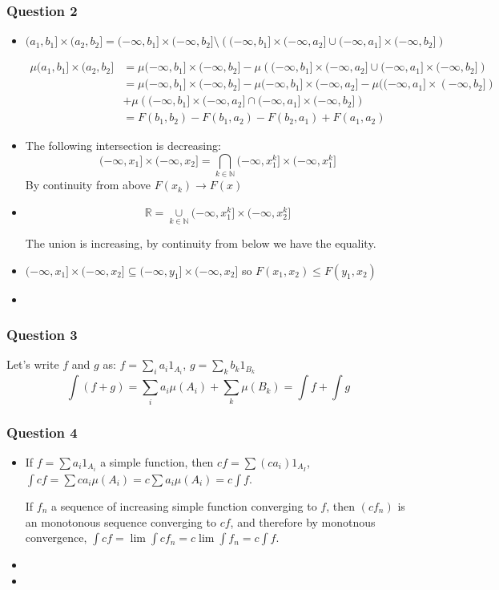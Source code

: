 \documentclass[12pt]{article}
\newcommand{\Q}[1]{\subsubsection*{Question #1}}
\newcommand{\union}[1]{\underset{#1}{\cup} }
\newcommand{\inter}[1]{\underset{#1}{\cap} }
\newcommand{\biginter}[1]{\underset{#1}{\bigcap} }
\begin{document}
\Q{2}
\begin{itemize}

\item
$$(a_1, b_1] \times (a_2, b_2] = (-\infty, b_1] \times (-\infty, b_2]
 \setminus 
\left( (-\infty, b_1] \times (-\infty, a_2] 
 \union{} (-\infty, a_1] \times (-\infty, b_2] \right)$$ 


\begin{align*}
\mu (a_1, b_1] \times (a_2, b_2] 
&= \mu (-\infty, b_1] \times (-\infty, b_2]
 -
\mu \left( (-\infty, b_1] \times (-\infty, a_2] 
 \union{} (-\infty, a_1] \times (-\infty, b_2] \right)\\
&= \mu (-\infty, b_1] \times (-\infty, b_2] 
-\mu  (-\infty, b_1] \times (-\infty, a_2] 
- \mu ((-\infty, a_1] \times (-\infty, b_2]) \\
&+ \mu \left( (-\infty, b_1] \times (-\infty, a_2] 
 \inter{} (-\infty, a_1] \times (-\infty, b_2] \right) \\
&= F(b_1, b_2) - F(b_1, a_2) - F(b_2, a_1) + F(a_1, a_2)
\end{align*}


\item
The following intersection is decreasing:
$$(-\infty, x_1] \times (-\infty, x_2] = \biginter{k \in \mathbb{N}} (-\infty, x^k_1] \times (-\infty, x^k_1]$$
By continuity from above $F(x_k) \rightarrow F(x)$


\item

$$\mathbb{R} = \union{k \in \mathbb{N}} (-\infty, x_1^k] \times (-\infty, x_2^k]$$

The union is increasing, by continuity from below we have the equality.


\item $(-\infty, x_1] \times (-\infty, x_2] \subseteq (-\infty, y_1] \times (-\infty, x_2] $ so $F(x_1, x_2) \leq F(y_1, x_2)$



\item 
\end{itemize}

\Q{3}
Let's write $f$ and $g$ as:
$f = \sum_i a_i 1_{A_i}$, $g = \sum_k b_k 1_{B_k}$
$$\int (f+g) = \sum_i a_i \mu(A_i) + \sum_k \mu(B_k) = \int f + \int g$$

\Q{4}
\begin{itemize}
\item
If $f = \sum a_i 1_{A_i}$ a simple function, then $cf = \sum (c a_i) 1_{A_I}$, $\int c f = \sum c a_i \mu(A_i) = c \sum a_i \mu(A_i) = c \int f$.


If $f_n$ a sequence of increasing simple function converging to $f$, then $(c f_n)$ is an monotonous sequence converging to $c f$, and therefore by monotnous convergence, $\int c f = \lim \int c f_n = c \lim \int f_n = c \int f$.

\item

\item


\end{itemize}
\end{document}
